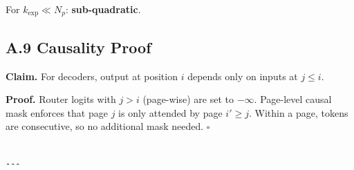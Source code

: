 For $k_\text{exp} \ll N_p$: \textbf{sub-quadratic}.

\subsection{A.9 Causality Proof}

\textbf{Claim.} For decoders, output at position $i$ depends only on inputs at $j \leq i$.

\textbf{Proof.} Router logits with $j > i$ (page-wise) are set to $-\infty$. 
Page-level causal mask enforces that page $j$ is only attended by page $i' \geq j$. Within a page, tokens are consecutive, so no additional mask needed. $\square$
\begin{lstlisting}

---
\end{lstlisting}